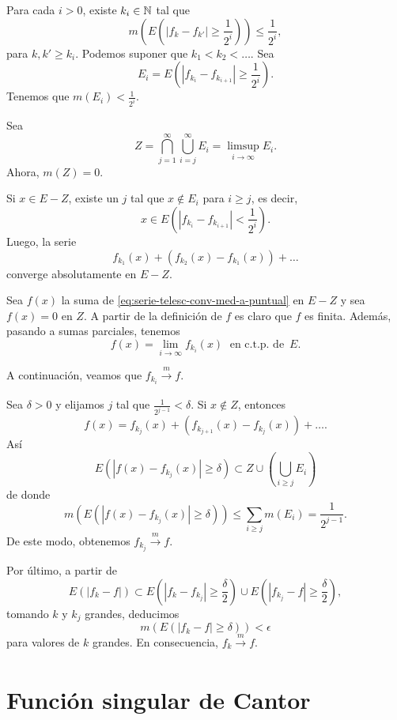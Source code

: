\begin{demo}
Para cada $i>0$, existe $k_i\in \mathbb{N}$ tal que 
\[
m\left(E\left(|f_k-f_{k'}|\geq \frac{1}{2^i}\right)\right)\leq
\frac{1}{2^i},
\]
para $k,k'\geq k_i$.
Podemos suponer que $k_1<k_2<\ldots$. Sea 
\[
E_i=E\left(   |f_{k_i} -f_{k_{i+1}}|\geq \frac{1}{2^i}\right).
\]
Tenemos que $m(E_i)<\frac{1}{2^i}$. 

Sea 
\[ Z=\bigcap\limits_{j=1}^{\infty}\bigcup\limits_{i=j}^{\infty} E_i
=\limsup\limits_{i \to \infty} E_i.
\]
Ahora, $m(Z)=0$. 

Si $x \in E-Z$, existe un $j$ tal que $x \notin E_i$ para $i\geq j$, es decir, 
\[
x\in E\left( \left|f_{k_i}-f_{k_{i+1}}\right|<\frac{1}{2^i}\right).
\]
Luego, la serie
\begin{equation}\label{eq:serie-telesc-conv-med-a-puntual}
f_{k_1}(x)+\left(f_{k_2}(x)-f_{k_1}(x)\right)+\ldots
\end{equation}
converge absolutamente en $E-Z$.

Sea $f(x)$ la suma de \eqref{eq:serie-telesc-conv-med-a-puntual} en $E-Z$ y sea $f(x)=0$ en $Z$. A partir de la definici\'on de $f$ es claro que $f$ es finita. Adem\'as, pasando a sumas parciales, tenemos
\[
f(x)=\lim\limits_{i \to \infty} f_{k_i}(x)\;\mbox{ en c.t.p. de } \,E.
\]

A continuaci\'on, veamos que $f_{k_i} \xrightarrow[]{m} f$.

Sea $\delta>0$ y elijamos $j$ tal que $\frac{1}{2^{j-1}}<\delta$. 
Si  $x\notin Z$, entonces 
\[
f(x)=
f_{k_j}(x)+\left(f_{k_{j+1}}(x)-f_{k_j}(x)\right)+\ldots.
\]
As\'i
\[
E\left(\left|f(x)-f_{k_j}(x)  \right|\geq \delta\right)\subset 
Z\cup \left(\bigcup\limits_{i\geq j} E_i\right)
\]
de donde
\[
m\left(
E\left(\left|f(x)-f_{k_j}(x)  \right|\geq \delta\right)
\right)
\leq \sum\limits_{i\geq j} m(E_i)=\frac{1}{2^{j-1}}.
\]
De este modo, obtenemos $f_{k_j} \xrightarrow[]{m} f$.

Por \'ultimo, a partir de 
\[
E\left(|f_k-f|\right)\subset 
E\left(|f_k -f_{k_j}|\geq \frac{\delta}{2}\right) \cup
E\left(|f_{k_j} -f|\geq \frac{\delta}{2}\right),
\]
tomando $k$ y $k_j$ grandes, deducimos
\[
m\left(E\left(\left|f_k-f\right|\geq \delta\right)\right)< \epsilon
\]
para valores de $k$ grandes. En consecuencia, $f_k \xrightarrow[]{m}f$.
\end{demo}

\section{Funci\'on singular de Cantor}

